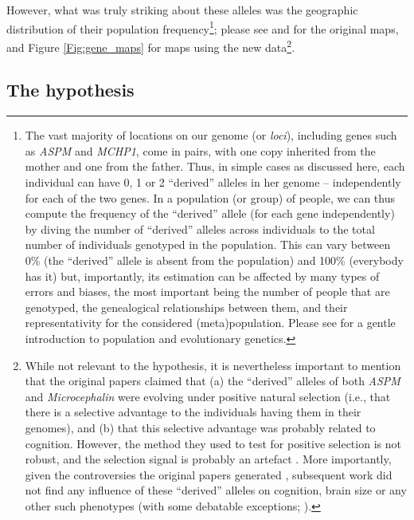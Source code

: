 \documentclass[twoside,onecolumn]{article}
\begin{document}
However, what was truly striking about these alleles was the geographic distribution of their population frequency\footnote{The vast majority of locations on our genome (or \emph{loci}), including genes such as \textit{ASPM} and \textit{MCHP1}, come in pairs, with one copy inherited from the mother and one from the father. Thus, in simple cases as discussed here, each individual can have 0, 1 or 2 ``derived'' alleles in her genome -- independently for each of the two genes. In a population (or group) of people, we can thus compute the frequency of the ``derived'' allele (for each gene independently) by diving the number of ``derived'' alleles across individuals to the total number of individuals genotyped in the population. This can vary between 0\% (the ``derived'' allele is absent from the population) and 100\% (everybody has it) but, importantly, its estimation can be affected by many types of errors and biases, the most important being the number of people that are genotyped, the genealogical relationships between them, and their representativity for the considered (meta)population. Please see \citet{jobling_human_2013} for a gentle introduction to population and evolutionary genetics.}; please see \citet[Fig. 1., p. 1721]{mekelbobrov_aspm_2005} and \citet[Fig. 3., p. 1719]{evans_microcephalin_2005} for the original maps, and Figure \ref{Fig:gene_maps} for maps using the new data\footnote{While not relevant to the \citet{dediu_ladd_2007} hypothesis, it is nevertheless important to mention that the original papers claimed that (a) the ``derived'' alleles of both \textit{ASPM} and \textit{Microcephalin} were evolving under positive natural selection (i.e., that there is a selective advantage to the individuals having them in their genomes), and (b) that this selective advantage was probably related to cognition. However, the method they used to test for positive selection is not robust, and the selection signal is probably an artefact \citep{currat_comment_2006,timpson_comment_2007}. More importantly, given the controversies the original papers generated \citep{saini_superior_2019}, subsequent work did not find any influence of these ``derived'' alleles on cognition, brain size or any other such phenotypes \citep{mekelbobrov_noselection_2007,rushton_noevidence_2007} (with some debatable exceptions; \citealp{woodley_relationship_2014,frost_aspmwriting_2008}).}.

\subsection{The hypothesis}
\end{document}
